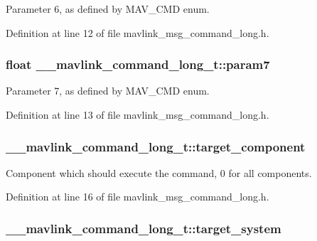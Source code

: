 Parameter 6, as defined by M\-A\-V\-\_\-\-C\-M\-D enum. 



Definition at line 12 of file mavlink\-\_\-msg\-\_\-command\-\_\-long.\-h.

\hypertarget{struct____mavlink__command__long__t_a1bf675e543b14770e7c410adb9d3d21e}{
\subsubsection[{param7}]{\setlength{\rightskip}{0pt plus 5cm}float \-\_\-\-\_\-mavlink\-\_\-command\-\_\-long\-\_\-t\-::param7}}\label{struct____mavlink__command__long__t_a1bf675e543b14770e7c410adb9d3d21e}


Parameter 7, as defined by M\-A\-V\-\_\-\-C\-M\-D enum. 



Definition at line 13 of file mavlink\-\_\-msg\-\_\-command\-\_\-long.\-h.

\hypertarget{struct____mavlink__command__long__t_ab2e28f55169c5076999e2c941bafce39}{
\subsubsection[{target\-\_\-component}]{ \-\_\-\-\_\-mavlink\-\_\-command\-\_\-long\-\_\-t\-::target\-\_\-component}}\label{struct____mavlink__command__long__t_ab2e28f55169c5076999e2c941bafce39}


Component which should execute the command, 0 for all components. 



Definition at line 16 of file mavlink\-\_\-msg\-\_\-command\-\_\-long.\-h.

\hypertarget{struct____mavlink__command__long__t_a705313e3359248c2e2b77d71b99a5d3d}{
\subsubsection[{target\-\_\-system}]{ \-\_\-\-\_\-mavlink\-\_\-command\-\_\-long\-\_\-t\-::target\-\_\-system}}\label{struct____mavlink__command__long__t_a705313e3359248c2e2b77d71b99a5d3d}


